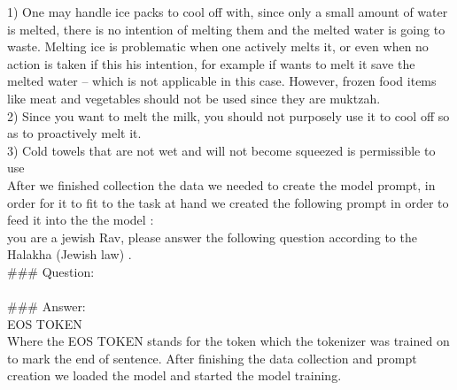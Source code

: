 \documentclass[11pt]{article}
\begin{document}
1) One may handle ice packs to cool off with, since only a small amount of water is melted, there is no intention of melting them and the melted water is going to waste. Melting ice is problematic when one actively melts it, or even when no action is taken if this his intention, for example if wants to melt it save the melted water – which is not applicable in this case.
However, frozen food items like meat and vegetables should not be used since they are muktzah.\\
2) Since you want to melt the milk, you should not purposely use it to cool off so as to proactively melt it.\\
3) Cold towels that are not wet and will not become squeezed is permissible to use\\
After we finished collection the data we needed to create the model prompt, in order for it to fit to the task at hand we created the following prompt in order to feed it into the the model : \\
you are a jewish Rav, please answer the following question according to the Halakha (Jewish law) .\\
\#\#\# Question:\\
\\
\#\#\# Answer:\\
{} EOS TOKEN\\
Where the EOS TOKEN stands for the token which the tokenizer was trained on to mark the end of sentence.
After finishing the data collection and prompt creation we loaded the model and started the model training.
\end{document}
